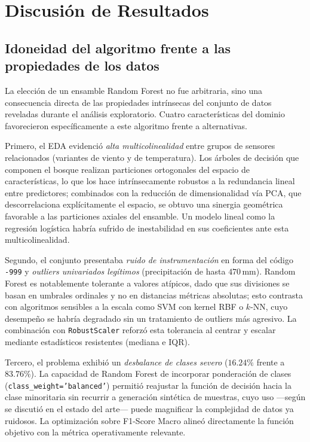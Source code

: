 \section{Discusión de Resultados}\label{sec:discussion}

\subsection{Idoneidad del algoritmo frente a las propiedades de los datos}
La elección de un ensamble Random Forest no fue arbitraria, sino una consecuencia
directa de las propiedades intrínsecas del conjunto de datos reveladas durante el
análisis exploratorio. Cuatro características del dominio favorecieron
específicamente a este algoritmo frente a alternativas.

Primero, el EDA evidenció \emph{alta multicolinealidad} entre grupos de sensores
relacionados (variantes de viento y de temperatura). Los árboles de decisión que
componen el bosque realizan particiones ortogonales del espacio de
características, lo que los hace intrínsecamente robustos a la redundancia lineal
entre predictores; combinados con la reducción de dimensionalidad vía PCA, que
descorrelaciona explícitamente el espacio, se obtuvo una sinergia geométrica
favorable a las particiones axiales del ensamble. Un modelo lineal como la
regresión logística habría sufrido de inestabilidad en sus coeficientes ante esta
multicolinealidad.

Segundo, el conjunto presentaba \emph{ruido de instrumentación} en forma del
código \texttt{-999} y \emph{outliers univariados legítimos} (precipitación de
hasta $470$\,mm). Random Forest es notablemente tolerante a valores atípicos, dado
que sus divisiones se basan en umbrales ordinales y no en distancias métricas
absolutas; esto contrasta con algoritmos sensibles a la escala como SVM con
kernel RBF o $k$-NN, cuyo desempeño se habría degradado sin un tratamiento de
outliers más agresivo. La combinación con \texttt{RobustScaler} reforzó esta
tolerancia al centrar y escalar mediante estadísticos resistentes (mediana e
IQR).

Tercero, el problema exhibió un \emph{desbalance de clases severo} ($16.24\%$
frente a $83.76\%$). La capacidad de Random Forest de incorporar ponderación de
clases (\texttt{class\_weight='balanced'}) permitió reajustar la función de
decisión hacia la clase minoritaria sin recurrir a generación sintética de
muestras, cuyo uso ---según se discutió en el estado del arte--- puede magnificar
la complejidad de datos ya ruidosos. La optimización sobre F1-Score Macro alineó
directamente la función objetivo con la métrica operativamente relevante.

